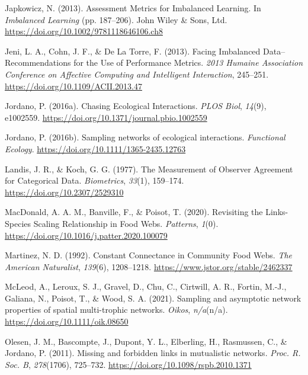 \documentclass[11pt]{article}
\newlength{\cslhangindent}
\newenvironment{CSLReferences}[2] %
 {%
  \setlength{\parindent}{0pt}
  \ifodd #1 \everypar{\setlength{\hangindent}{\cslhangindent}}\ignorespaces\fi
  \ifnum #2 > 0
  \setlength{\parskip}{#2\baselineskip}
  \fi
 }%
 {}
\begin{document}
\begin{CSLReferences}{1}{0}
\leavevmode{}%
Japkowicz, N. (2013). Assessment Metrics for Imbalanced Learning. In
\emph{Imbalanced Learning} (pp. 187--206). John Wiley \& Sons, Ltd.
\url{https://doi.org/10.1002/9781118646106.ch8}

\leavevmode{}%
Jeni, L. A., Cohn, J. F., \& De La Torre, F. (2013). Facing Imbalanced
Data--Recommendations for the Use of Performance Metrics. \emph{2013
Humaine Association Conference on Affective Computing and Intelligent
Interaction}, 245--251. \url{https://doi.org/10.1109/ACII.2013.47}

\leavevmode{}%
Jordano, P. (2016a). Chasing Ecological Interactions. \emph{PLOS Biol},
\emph{14}(9), e1002559.
\url{https://doi.org/10.1371/journal.pbio.1002559}

\leavevmode{}%
Jordano, P. (2016b). Sampling networks of ecological interactions.
\emph{Functional Ecology}. \url{https://doi.org/10.1111/1365-2435.12763}

\leavevmode{}%
Landis, J. R., \& Koch, G. G. (1977). The Measurement of Observer
Agreement for Categorical Data. \emph{Biometrics}, \emph{33}(1),
159--174. \url{https://doi.org/10.2307/2529310}

\leavevmode{}%
MacDonald, A. A. M., Banville, F., \& Poisot, T. (2020). Revisiting the
Links-Species Scaling Relationship in Food Webs. \emph{Patterns},
\emph{1}(0). \url{https://doi.org/10.1016/j.patter.2020.100079}

\leavevmode{}%
Martinez, N. D. (1992). Constant Connectance in Community Food Webs.
\emph{The American Naturalist}, \emph{139}(6), 1208--1218.
\url{https://www.jstor.org/stable/2462337}

\leavevmode{}%
McLeod, A., Leroux, S. J., Gravel, D., Chu, C., Cirtwill, A. R., Fortin,
M.-J., Galiana, N., Poisot, T., \& Wood, S. A. (2021). Sampling and
asymptotic network properties of spatial multi-trophic networks.
\emph{Oikos}, \emph{n/a}(n/a). \url{https://doi.org/10.1111/oik.08650}

\leavevmode{}%
Olesen, J. M., Bascompte, J., Dupont, Y. L., Elberling, H., Rasmussen,
C., \& Jordano, P. (2011). Missing and forbidden links in mutualistic
networks. \emph{Proc. R. Soc. B}, \emph{278}(1706), 725--732.
\url{https://doi.org/10.1098/rspb.2010.1371}


\end{CSLReferences}
\end{document}
